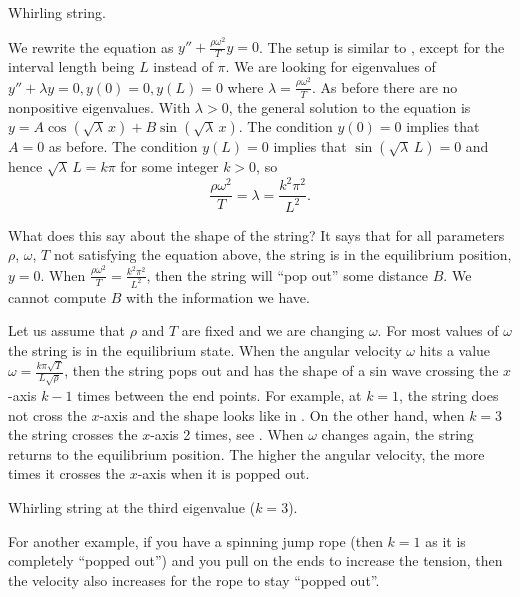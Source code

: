 \documentclass{ximera}
\begin{document}
\begin{myfig}
    \capstart
    
    \caption{Whirling string.\label{bvp:whirstringfig}}
\end{myfig}

We rewrite the equation as $y'' + \frac{\rho \omega^2}{T} y = 0$. The setup is similar to , except for the interval length being $L$ instead of $\pi$.  We are looking for eigenvalues of $y'' + \lambda y = 0, y(0) = 0, y(L) = 0$ where $\lambda = \frac{\rho \omega^2}{T}$.  As before there are no nonpositive eigenvalues.  With $\lambda > 0$, the general solution to the equation is $y = A \cos (  \sqrt{\lambda} \,x ) + B \sin ( \sqrt{\lambda} \,x )$.  The condition $y(0) = 0$ implies that $A = 0$ as before.  The condition $y(L) = 0$ implies that $\sin ( \sqrt{\lambda} \, L) = 0$ and hence $\sqrt{\lambda} \, L = k \pi$  for some integer $k > 0$, so
\begin{equation*}
    \frac{\rho \omega^2}{T} = \lambda = \frac{k^2 \pi^2}{L^2} .
\end{equation*}

What does this say about the shape of the string?  It says that for all parameters $\rho$, $\omega$, $T$ not satisfying the equation above, the string is in the equilibrium position, $y=0$.  When $\frac{\rho \omega^2}{T} = \frac{k^2 \pi^2}{L^2}$, then the string will ``pop out'' some distance $B$.  We cannot compute $B$ with the information we have.

Let us assume that $\rho$ and $T$ are fixed and we are changing $\omega$. For most values of $\omega$ the string is in the equilibrium state.  When  the angular velocity $\omega$ hits a value $\omega = \frac{k \pi \sqrt{T}}{L\sqrt{\rho}}$, then the string pops out and has the shape of a sin wave crossing the $x$-axis $k-1$ times between the end points. For example, at $k=1$, the string does not cross the $x$-axis and the shape looks like in . On the other hand, when $k=3$ the string crosses the $x$-axis 2 times, see . When $\omega$ changes again, the string returns to the equilibrium position. The higher the angular velocity, the more times it crosses the $x$-axis when it is popped out.

\begin{myfig}
    \capstart
    
    \caption{Whirling string at the third eigenvalue ($k=3$).\label{bvp:whirstring2fig}}
\end{myfig}

For another example, if you have a spinning jump rope (then $k=1$ as it is completely ``popped out'') and you pull on the ends to increase the tension, then the velocity also increases for the rope to stay ``popped out''.
\end{document}
